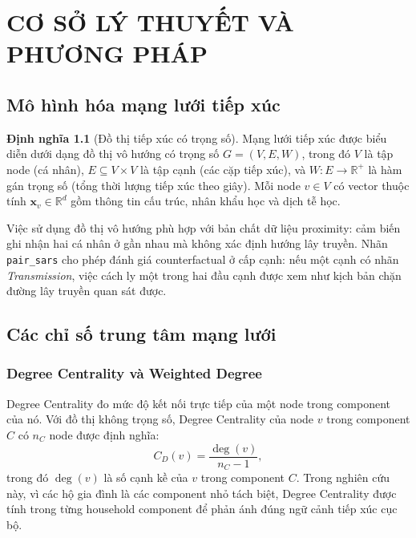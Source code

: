 \documentclass[12pt,a4paper]{report}
\theoremstyle{definition}
\newtheorem{definition}{Định nghĩa}[chapter]
\begin{document}
\chapter{CƠ SỞ LÝ THUYẾT VÀ PHƯƠNG PHÁP}

\section{Mô hình hóa mạng lưới tiếp xúc}

\begin{definition}[Đồ thị tiếp xúc có trọng số]
Mạng lưới tiếp xúc được biểu diễn dưới dạng đồ thị vô hướng có trọng số $G=(V,E,W)$, trong đó $V$ là tập node (cá nhân), $E \subseteq V \times V$ là tập cạnh (các cặp tiếp xúc), và $W: E \rightarrow \mathbb{R}^+$ là hàm gán trọng số (tổng thời lượng tiếp xúc theo giây). Mỗi node $v \in V$ có vector thuộc tính $\mathbf{x}_v \in \mathbb{R}^d$ gồm thông tin cấu trúc, nhân khẩu học và dịch tễ học.
\end{definition}

Việc sử dụng đồ thị vô hướng phù hợp với bản chất dữ liệu proximity: cảm biến ghi nhận hai cá nhân ở gần nhau mà không xác định hướng lây truyền. Nhãn \texttt{pair\_sars} cho phép đánh giá counterfactual ở cấp cạnh: nếu một cạnh có nhãn \textit{Transmission}, việc cách ly một trong hai đầu cạnh được xem như kịch bản chặn đường lây truyền quan sát được.

\section{Các chỉ số trung tâm mạng lưới}

\subsection{Degree Centrality và Weighted Degree}

Degree Centrality đo mức độ kết nối trực tiếp của một node trong component của nó. Với đồ thị không trọng số, Degree Centrality của node $v$ trong component $C$ có $n_C$ node được định nghĩa:
\begin{equation}
  C_D(v) = \frac{\deg(v)}{n_C - 1},
  \label{eq:degree_centrality}
\end{equation}
trong đó $\deg(v)$ là số cạnh kề của $v$ trong component $C$. Trong nghiên cứu này, vì các hộ gia đình là các component nhỏ tách biệt, Degree Centrality được tính trong từng household component để phản ánh đúng ngữ cảnh tiếp xúc cục bộ.
\end{document}
